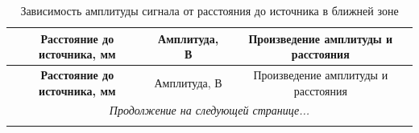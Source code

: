 \documentclass[a4paper,14pt]{article}
\begin{document}
\begin{longtable}{|c|c|c|}
    \caption{Зависимость амплитуды сигнала от расстояния до источника в ближней зоне} \label{tab:tab1} \\
    \hline
    \textbf{Расстояние до источника, мм} & Амплитуда, В & Произведение амплитуды и расстояния \\
    \hline
    \endfirsthead

    \hline
    \textbf{Расстояние до источника, мм} & Амплитуда, В & Произведение амплитуды и расстояния \\
    \hline
    \endhead

    \hline
    \multicolumn{3}{|c|}{\textit{Продолжение на следующей странице...}} \\ \hline
    \endfoot

    \hline
    \endlastfoot


\end{longtable}
\end{document}
